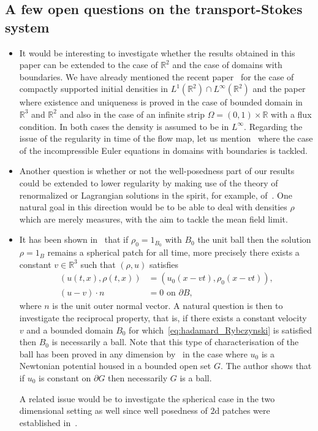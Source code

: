 \documentclass[AHL,Unicode,longabstracts,published]{cedram}
\newcommand{\R}{\mathbb{R}}
\begin{document}
\subsection{A few open questions on the transport-Stokes system}


\begin{itemize}
\item It would be interesting to investigate whether the results obtained in this paper can be extended to the case of $\R^2$ and the case of domains with boundaries. We have already mentioned the recent paper~\cite{GrayerII} for the case of compactly supported initial densities in $L^1(\R^2)\cap L^\infty(\R^2)$ and the paper~\cite{Leblond} where existence and uniqueness is proved in the case of bounded domain in $\R^3$ and $\R^2$ and also in the case of an infinite strip $\Omega= (0,1)\times \R$ with a flux condition. In both cases the density is assumed to be in $ L^{\infty}$. Regarding the issue of the regularity in time of the flow map, let us mention~\cite{ogfstt,GS,Kato,Sueur} where the case of the incompressible Euler equations in domains with boundaries is tackled.

\item Another question is whether or not the well-posedness part of our results could be extended to lower regularity by making use of the theory of renormalized or Lagrangian solutions in the spirit, for example, of~\cite{CCS,Lions}. One natural goal in this direction would be to be able to deal with densities $\rho$ which are merely measures, with the aim to tackle the mean field limit.
\item It has been shown in~\cite{Mecherbet2} that if $\rho_0=1_{B_0}$ with $B_0$ the unit ball then the solution $\rho=1_{B}$ remains a spherical patch for all time, more precisely there exists a constant $v\in \R^3$ such that $(\rho,u)$ satisfies
\begin{equation}\label{eq:hadamard_Rybczynski}
\begin{split}
(u(t,x),\rho(t,x))&=(u_0(x-vt),\rho_0(x-vt)),\\
(u-v)\cdot n& = 0 \text{ on } \partial B,
\end{split}
\end{equation}
where $n$ is the unit outer normal vector. A natural question is then to investigate the reciprocal property, that is, if there exists a constant velocity $v$ and a bounded domain $B_0$ for which~\eqref{eq:hadamard_Rybczynski} is satisfied then $B_0$ is necessarily a ball. Note that this type of characterisation of the ball has been proved in any dimension by~\cite[Theorem~1.1]{Fraenkel} in the case where $u_0$ is a Newtonian potential housed in a bounded open set $G$. The author shows that if $u_0$ is constant on $\partial G$ then necessarily $G$ is a ball.

A related issue would be to investigate the spherical case in the two dimensional setting as well since well posedness of $2$d patches were established in~\cite{GrayerII}.
\end{itemize}
\end{document}
